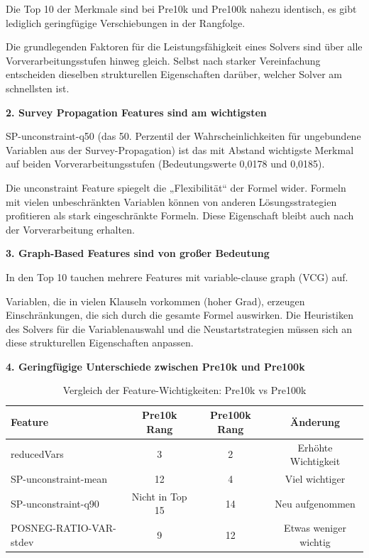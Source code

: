 Die Top 10 der Merkmale sind bei Pre10k und Pre100k nahezu identisch, es gibt lediglich geringfügige 
Verschiebungen in der Rangfolge.

Die grundlegenden Faktoren für die Leistungsfähigkeit eines Solvers sind über alle Vorverarbeitungsstufen 
hinweg gleich. Selbst nach starker Vereinfachung entscheiden dieselben strukturellen Eigenschaften 
darüber, welcher Solver am schnellsten ist.

\textbf{2. Survey Propagation Features sind am wichtigsten}

SP-unconstraint-q50 (das 50. Perzentil der Wahrscheinlichkeiten für ungebundene Variablen aus der 
Survey-Propagation) ist das mit Abstand wichtigste Merkmal auf beiden Vorverarbeitungsstufen 
(Bedeutungswerte 0,0178 und 0,0185).

Die unconstraint Feature spiegelt die „Flexibilität“ der Formel wider. Formeln mit vielen unbeschränkten 
Variablen können von anderen Lösungsstrategien profitieren als stark eingeschränkte Formeln. Diese 
Eigenschaft bleibt auch nach der Vorverarbeitung erhalten.

\textbf{3. Graph-Based Features sind von großer Bedeutung}

In den Top 10 tauchen mehrere Features mit variable-clause graph (VCG) auf.

Variablen, die in vielen Klauseln vorkommen (hoher Grad), erzeugen Einschränkungen, die sich durch 
die gesamte Formel auswirken. Die Heuristiken des Solvers für die Variablenauswahl und die 
Neustartstrategien müssen sich an diese strukturellen Eigenschaften anpassen.

\textbf{4. Geringfügige Unterschiede zwischen Pre10k und Pre100k}

\begin{table}[H]
    \centering
    \begin{tabular}{lccc}
        \toprule
        \textbf{Feature} & \textbf{Pre10k Rang} & \textbf{Pre100k Rang} & \textbf{Änderung} \\
        \midrule
        reducedVars & 3 & 2 & Erhöhte Wichtigkeit \\
        \midrule
        SP-unconstraint-mean & 12 & 4 & Viel wichtiger \\
        \midrule
        SP-unconstraint-q90 & Nicht in Top 15 & 14 & Neu aufgenommen \\
        \midrule
        POSNEG-RATIO-VAR-stdev & 9 & 12 & Etwas weniger wichtig \\
        \bottomrule
    \end{tabular}
    \caption{Vergleich der Feature-Wichtigkeiten: Pre10k vs Pre100k}\label{tab:feature_importance_comparison}
\end{table}

